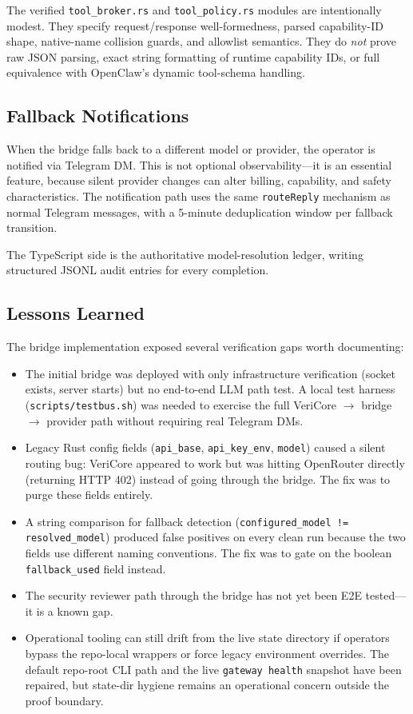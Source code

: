 \documentclass[11pt]{article}
\begin{document}
The verified \texttt{tool\_broker.rs} and \texttt{tool\_policy.rs} modules are intentionally modest. They specify request/response well-formedness, parsed capability-ID shape, native-name collision guards, and allowlist semantics. They do \emph{not} prove raw JSON parsing, exact string formatting of runtime capability IDs, or full equivalence with OpenClaw's dynamic tool-schema handling.

\subsection{Fallback Notifications}
When the bridge falls back to a different model or provider, the operator is notified via Telegram DM. This is not optional observability---it is an essential feature, because silent provider changes can alter billing, capability, and safety characteristics. The notification path uses the same \texttt{routeReply} mechanism as normal Telegram messages, with a 5-minute deduplication window per fallback transition.

The TypeScript side is the authoritative model-resolution ledger, writing structured JSONL audit entries for every completion.

\subsection{Lessons Learned}
The bridge implementation exposed several verification gaps worth documenting:
\begin{itemize}[leftmargin=1.5em]
\item The initial bridge was deployed with only infrastructure verification (socket exists, server starts) but no end-to-end LLM path test. A local test harness (\texttt{scripts/testbus.sh}) was needed to exercise the full VeriCore $\to$ bridge $\to$ provider path without requiring real Telegram DMs.
\item Legacy Rust config fields (\texttt{api\_base}, \texttt{api\_key\_env}, \texttt{model}) caused a silent routing bug: VeriCore appeared to work but was hitting OpenRouter directly (returning HTTP 402) instead of going through the bridge. The fix was to purge these fields entirely.
\item A string comparison for fallback detection (\texttt{configured\_model != resolved\_model}) produced false positives on every clean run because the two fields use different naming conventions. The fix was to gate on the boolean \texttt{fallback\_used} field instead.
\item The security reviewer path through the bridge has not yet been E2E tested---it is a known gap.
\item Operational tooling can still drift from the live state directory if operators bypass the repo-local wrappers or force legacy environment overrides. The default repo-root CLI path and the live \texttt{gateway health} snapshot have been repaired, but state-dir hygiene remains an operational concern outside the proof boundary.
\end{itemize}
\end{document}
